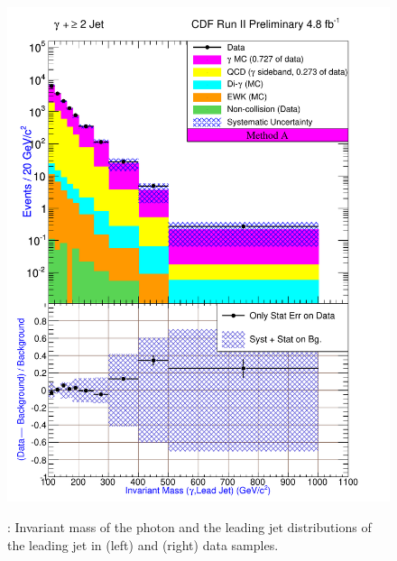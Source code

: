 \documentclass[11pt]{article}
\begin{document}
\begin{figure}[h!]
{ \includegraphics[scale=\resultsHistScale,keepaspectratio=true]{./g30jet_MtdA_plot2_InvMass_pj1.pdf}
}
 \caption{: Invariant mass of the photon and the leading jet distributions of the leading jet in \phoonejet (left) and \photwojet (right) data samples.}
 \label{fig:Result_MtdA_gj1_Mass_gj1}
\end{figure}
\end{document}
